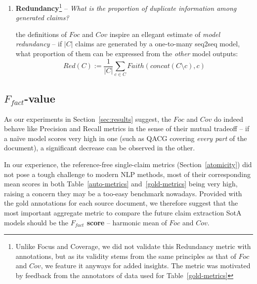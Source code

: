 \begin{enumerate}
    \item \textbf{Redundancy}\footnote{\label{fn:redundancy}Unlike Focus and Coverage, we did not validate this Redundancy metric with annotations, but as its validity stems from the same principles as that of $Foc$ and $Cov$, we feature it anyways for added insights. The metric was motivated by feedback from the annotators of data used for Table~\ref{gold-metrics}} -- \textit{What is the proportion of duplicate information among generated claims?}
    
    the definitions of $Foc$ and $Cov$ inspire an ellegant estimate of \textit{model redundancy} -- if $|C|$ claims are generated by a one-to-many seq2seq model, what proportion of them can be expressed from the \textit{other} model outputs:
    $$Red(C) := \frac{1}{|C|}\sum_{c\in C}Faith(concat(C\setminus c), c)$$ 
\end{enumerate}

\subsection{\textbf{$F_{fact}$-value}}
\label{ffact}
As our experiments in Section~\ref{sec:results} suggest, the $Foc$ and $Cov$ do indeed behave like Precision and Recall metrics in the sense of their mutual tradeoff -- if a na\"ive model scores very high in one (such as QACG covering \textit{every part} of the \ds{} document), a significant decrease can be observed in the other.
    
In our experience, the reference-free single-claim metrics (Section~\ref{atomicity}) did not pose a tough challenge to modern NLP methods, most of their corresponding mean scores in both Table~\ref{auto-metrics} and~\ref{gold-metrics} being very high, raising a concern they may be a too-easy benchmark nowadays.
Provided with the gold annotations for each source document, we therefore suggest that the most important aggregate metric to compare the future claim extraction SotA models should be the \textbf{$F_{fact}$ score} -- harmonic mean of $Foc$ and $Cov$.